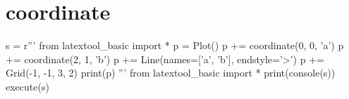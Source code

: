 \section{coordinate}

\begin{python}
s = r'''
from latextool_basic import *
p = Plot()
p += coordinate(0, 0, 'a')
p += coordinate(2, 1, 'b')
p += Line(names=['a', 'b'], endstyle='>')
p += Grid(-1, -1, 3, 2)
print(p)
'''
from latextool_basic import *
print(console(s))
execute(s)
\end{python}
